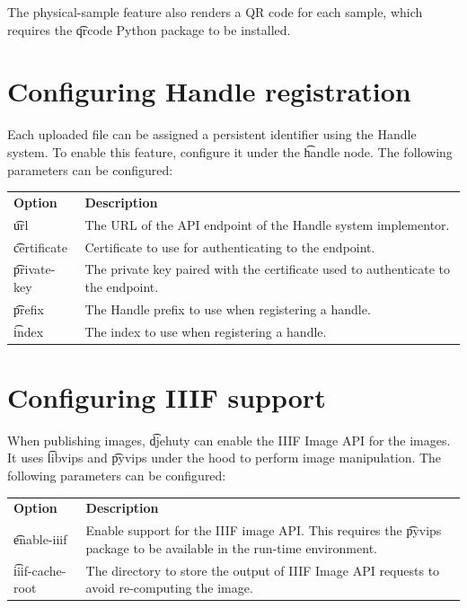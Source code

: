   The physical-sample feature also renders a QR code for each sample, which
  requires the \t{qrcode} Python package to be installed.

\section{Configuring Handle registration}

  Each uploaded file can be assigned a persistent identifier using the Handle
  system.  To enable this feature, configure it under the \t{handle} node.
  The following parameters can be configured:

\begin{tabularx}{\textwidth}{*{1}{!{\VRule[-1pt]}l}!{\VRule[-1pt]}X}
  \headrow
  \textbf{Option}             & \textbf{Description}\\
  \t{url}                     & The URL of the API endpoint of the Handle
                                system implementor.\\
  \t{certificate}             & Certificate to use for authenticating to the
                                endpoint.\\
  \t{private-key}             & The private key paired with the certificate
                                used to authenticate to the endpoint.\\
  \t{prefix}                  & The Handle prefix to use when registering a
                                handle.\\
  \t{index}                   & The index to use when registering a handle.
\end{tabularx}

\section{Configuring IIIF support}

  When publishing images, \t{djehuty} can enable the IIIF Image API for the
  images. It uses \t{libvips} and \t{pyvips} under the hood to perform image
  manipulation.  The following parameters can be configured:

\begin{tabularx}{\textwidth}{*{1}{!{\VRule[-1pt]}l}!{\VRule[-1pt]}X}
  \headrow
  \textbf{Option}             & \textbf{Description}\\
  \t{enable-iiif}             & Enable support for the IIIF image API.  This
                                requires the \t{pyvips} package to be available
                                in the run-time environment.\\
  \t{iiif-cache-root}         & The directory to store the output of IIIF Image
                                API requests to avoid re-computing the image.
\end{tabularx}

